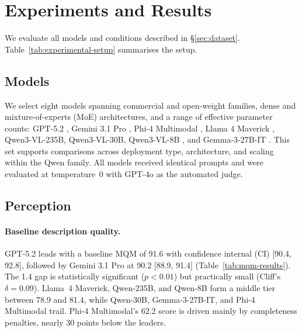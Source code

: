 \section{Experiments and Results}
\label{sec:results}

We evaluate all models and conditions described in \S\ref{sec:dataset}. Table~\ref{tab:experimental-setup} summarises the setup.

\subsection{Models}
\label{sec:models}

We select eight models spanning commercial and open-weight families, dense and mixture-of-experts (MoE) architectures, and a range of effective parameter counts: GPT-5.2 \citep{openai2025gpt5}, Gemini 3.1 Pro \citep{google2026gemini31pro}, Phi-4 Multimodal \citep{abouelenin2025phi4}, Llama 4 Maverick \citep{meta2025llama4}, Qwen3-VL-235B, Qwen3-VL-30B, Qwen3-VL-8B \citep{qwen2025qwen3vl}, and Gemma-3-27B-IT \citep{gemma2025gemma3}. This set supports comparisons across deployment type, architecture, and scaling within the Qwen family. All models received identical prompts and were evaluated at temperature~0 with GPT-4o \citep{openai2024gpt4o} as the automated judge.

\subsection{Perception}
\label{sec:perception-results}

\paragraph{Baseline description quality.}
GPT-5.2 leads with a baseline MQM of 91.6 with confidence internal (CI) [90.4, 92.8], followed by Gemini 3.1 Pro at 90.2 [88.9, 91.4] (Table~\ref{tab:mqm-results}). The 1.4 gap is statistically significant ($p < 0.01$) but practically small (Cliff's $\delta = 0.09$). Llama~4 Maverick, Qwen-235B, and Qwen-8B form a middle tier between 78.9 and 81.4, while Qwen-30B, Gemma-3-27B-IT, and Phi-4 Multimodal trail. Phi-4 Multimodal's 62.2 score is driven mainly by completeness penalties, nearly 30 points below the leaders.


